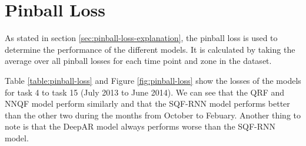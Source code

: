\section{Pinball Loss}
\label{sec:elaboration-pinball-loss}

As stated in section \ref{sec:pinball-loss-explanation}, the pinball loss is 
used to determine the performance of the different models. 
It is calculated by taking the average over all pinball losses for each time 
point and zone in the dataset. 

Table \ref{table:pinball-loss} and Figure \ref{fig:pinball-loss} show the 
losses of the models for task 4 to task 15 (July 2013 to June 2014). 
We can see that the QRF and NNQF model perform similarly and that the 
SQF-RNN model performs better than the other two during the months from October to Febuary.
Another thing to note is that the DeepAR model always performs worse than the SQF-RNN model.

